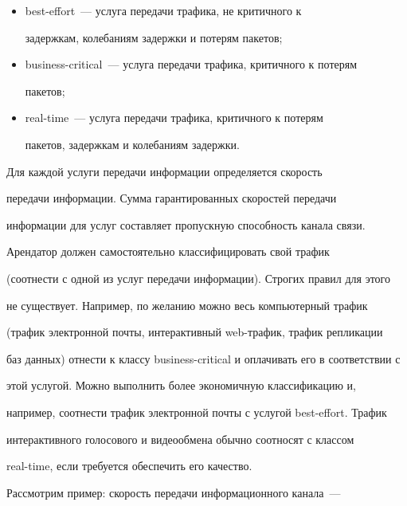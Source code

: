       \begin{itemize}


      \item best-effort~--- услуга передачи трафика, не критичного к 


задержкам, колебаниям задержки и потерям пакетов;


      \item business-critical~--- услуга передачи трафика, критичного к потерям 


пакетов;


      \item real-time~--- услуга передачи трафика, критичного к потерям 


пакетов, задержкам и колебаниям задержки.


      \end{itemize}


      


      Для каждой услуги передачи информации определяется скорость 


передачи информации. Сумма гарантированных скоростей передачи 


информации для услуг составляет пропускную способность канала связи.


      


      Арендатор должен самостоятельно классифицировать свой трафик 


(соотнести с одной из услуг передачи информации). Строгих правил для этого 


не существует. Например, по желанию можно весь компьютерный трафик 


(трафик электронной почты, интерактивный web-трафик, трафик репликации 


баз данных) отнести к классу business-critical и оплачивать его в соответствии с 


этой услугой. Можно выполнить более экономичную классификацию и, 


например, соотнести трафик электронной почты с услугой best-effort. Трафик 


интерактивного голосового и видеообмена обычно соотносят с классом 


      real-time, если требуется обеспечить его качество.


      


      Рассмотрим пример: скорость передачи информационного канала~--- 


